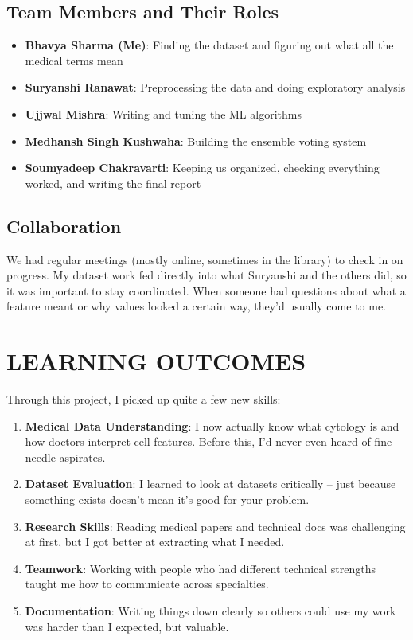 \documentclass[12pt]{article}
\begin{document}
\subsection{Team Members and Their Roles}

\begin{itemize}
    \item \textbf{Bhavya Sharma (Me)}: Finding the dataset and figuring out what all the medical terms mean
    \item \textbf{Suryanshi Ranawat}: Preprocessing the data and doing exploratory analysis
    \item \textbf{Ujjwal Mishra}: Writing and tuning the ML algorithms
    \item \textbf{Medhansh Singh Kushwaha}: Building the ensemble voting system
    \item \textbf{Soumyadeep Chakravarti}: Keeping us organized, checking everything worked, and writing the final report
\end{itemize}

\subsection{Collaboration}
We had regular meetings (mostly online, sometimes in the library) to check in on progress. My dataset work fed directly into what Suryanshi and the others did, so it was important to stay coordinated. When someone had questions about what a feature meant or why values looked a certain way, they'd usually come to me.

\newpage
\section{LEARNING OUTCOMES}

Through this project, I picked up quite a few new skills:

\begin{enumerate}
    \item \textbf{Medical Data Understanding}: I now actually know what cytology is and how doctors interpret cell features. Before this, I'd never even heard of fine needle aspirates.
    
    \item \textbf{Dataset Evaluation}: I learned to look at datasets critically -- just because something exists doesn't mean it's good for your problem.
    
    \item \textbf{Research Skills}: Reading medical papers and technical docs was challenging at first, but I got better at extracting what I needed.
    
    \item \textbf{Teamwork}: Working with people who had different technical strengths taught me how to communicate across specialties.
    
    \item \textbf{Documentation}: Writing things down clearly so others could use my work was harder than I expected, but valuable.
\end{enumerate}
\end{document}

